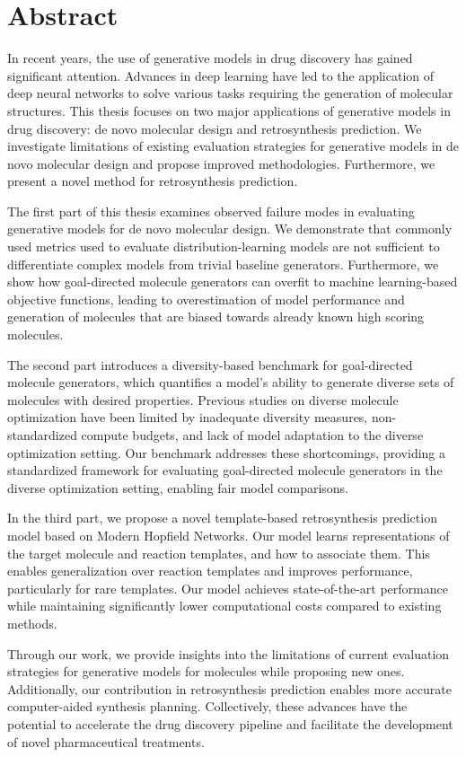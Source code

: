
{%
\chapter*{Abstract}
In recent years, the use of generative models in drug discovery has gained significant attention. Advances in deep
learning have led to the application of deep neural networks to solve various tasks requiring the generation of
molecular structures. This thesis focuses on two major applications of generative models in drug discovery: de novo
molecular design and retrosynthesis prediction. We investigate limitations of existing evaluation strategies for
generative models in de novo molecular design and propose improved methodologies. Furthermore, we present a novel method
for retrosynthesis prediction. 

The first part of this thesis examines observed failure modes in evaluating generative models for de novo molecular
design. We demonstrate that commonly used metrics used to evaluate distribution-learning models are not sufficient to
differentiate complex models from trivial baseline generators. Furthermore, we show how goal-directed molecule
generators can overfit to machine learning-based objective functions, leading to overestimation of model performance and
generation of molecules that are biased towards already known high scoring molecules. 

The second part introduces a diversity-based benchmark for goal-directed molecule generators, which quantifies a model's
ability to generate diverse sets of molecules with desired properties. Previous studies on diverse molecule optimization
have been limited by inadequate diversity measures, non-standardized compute budgets, and lack of model adaptation to
the diverse optimization setting. Our benchmark addresses these shortcomings, providing a standardized framework for
evaluating goal-directed molecule generators in the diverse optimization setting, enabling fair model comparisons.

In the third part, we propose a novel template-based retrosynthesis prediction model based on Modern Hopfield Networks.
Our model learns representations of the target molecule and reaction templates, and how to associate them. This enables
generalization over reaction templates and improves performance, particularly for rare templates. Our model achieves
state-of-the-art performance while maintaining significantly lower computational costs compared to existing methods.

Through our work, we provide insights into the limitations of current evaluation strategies for generative models for
molecules while proposing new ones. Additionally, our contribution in retrosynthesis prediction enables more accurate
computer-aided synthesis planning. Collectively, these advances have the potential to accelerate the drug discovery
pipeline and facilitate the development of novel pharmaceutical treatments. }%